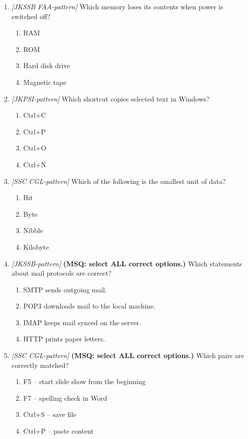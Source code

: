 \documentclass[11pt]{article}
\begin{document}
\begin{enumerate}[label=\textbf{Q\arabic*.}, leftmargin=*]
\item \textit{[JKSSB FAA-pattern]} Which memory loses its contents when power is switched off?
  \begin{enumerate}[label=\Alph*.]
    \item RAM
    \item ROM
    \item Hard disk drive
    \item Magnetic tape
  \end{enumerate}
\item \textit{[JKPSI-pattern]} Which shortcut copies selected text in Windows?
  \begin{enumerate}[label=\Alph*.]
    \item Ctrl+C
    \item Ctrl+P
    \item Ctrl+O
    \item Ctrl+N
  \end{enumerate}
\item \textit{[SSC CGL-pattern]} Which of the following is the smallest unit of data?
  \begin{enumerate}[label=\Alph*.]
    \item Bit
    \item Byte
    \item Nibble
    \item Kilobyte
  \end{enumerate}
\item \textit{[JKSSB-pattern]} \textbf{(MSQ: select ALL correct options.)} Which statements about mail protocols are correct?
  \begin{enumerate}[label=\Alph*.]
    \item SMTP sends outgoing mail.
    \item POP3 downloads mail to the local machine.
    \item IMAP keeps mail synced on the server.
    \item HTTP prints paper letters.
  \end{enumerate}
\item \textit{[SSC CGL-pattern]} \textbf{(MSQ: select ALL correct options.)} Which pairs are correctly matched?
  \begin{enumerate}[label=\Alph*.]
    \item F5 -- start slide show from the beginning
    \item F7 -- spelling check in Word
    \item Ctrl+S -- save file
    \item Ctrl+P -- paste content
  \end{enumerate}
\end{enumerate}
\def\JKSSBLessonID{58}\def\JKSSBAnswers{0}
\end{document}
